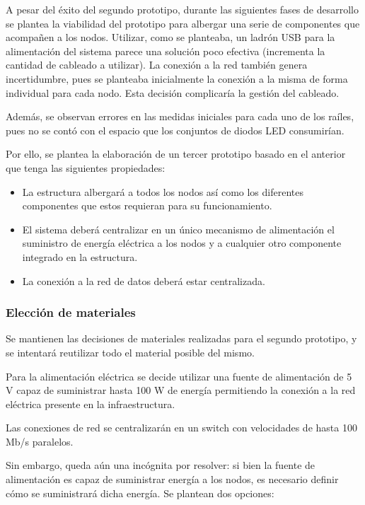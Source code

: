 A pesar del éxito del segundo prototipo, durante las siguientes fases de desarrollo se plantea la viabilidad del prototipo para albergar una serie de componentes que acompañen a los nodos. Utilizar, como se planteaba, un ladrón USB %
para la alimentación del sistema parece una solución poco efectiva (incrementa la cantidad de cableado a utilizar). La conexión a la red también genera incertidumbre, pues se planteaba inicialmente la conexión a la misma de forma individual para cada nodo. Esta decisión complicaría la gestión del cableado.

Además, se observan errores en las medidas iniciales para cada uno de los raíles, pues no se contó con el espacio que los conjuntos de diodos LED consumirían.

Por ello, se plantea la elaboración de un tercer prototipo basado en el anterior que tenga las siguientes propiedades:

\begin{itemize}

\item La estructura albergará a todos los nodos así como los diferentes componentes que estos requieran para su funcionamiento.

\item El sistema deberá centralizar en un único mecanismo de alimentación el suministro de energía eléctrica a los nodos y a cualquier otro componente integrado en la estructura.

\item La conexión a la red de datos deberá estar centralizada.

\end{itemize}

\subsubsection{Elección de materiales}

Se mantienen las decisiones de materiales realizadas para el segundo prototipo, y se intentará reutilizar todo el material posible del mismo.

Para la alimentación eléctrica se decide utilizar una fuente de alimentación de 5 V capaz de suministrar hasta 100 W de energía permitiendo la conexión a la red eléctrica presente en la infraestructura.

Las conexiones de red se centralizarán en un switch con velocidades de hasta 100 Mb/s paralelos.

Sin embargo, queda aún una incógnita por resolver: si bien la fuente de alimentación es capaz de suministrar energía a los nodos, es necesario definir cómo se suministrará dicha energía. Se plantean dos opciones:

